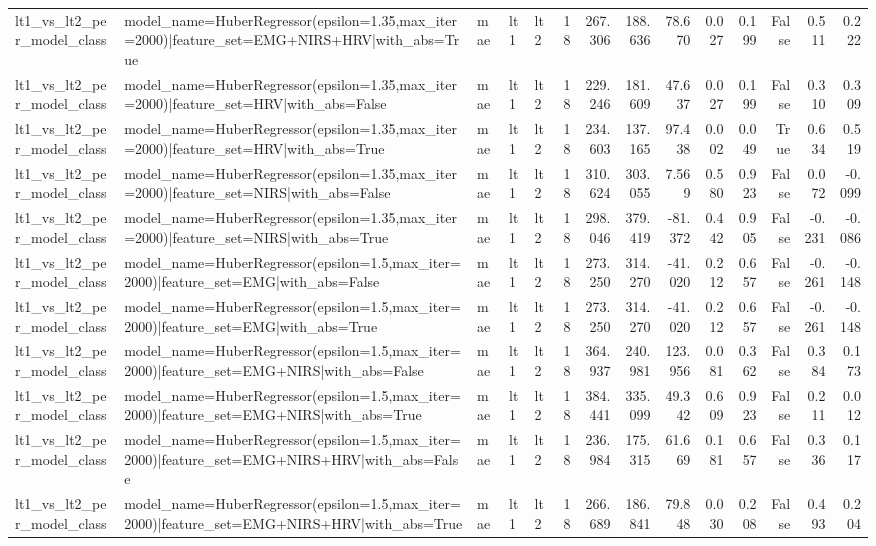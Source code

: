 \begin{table}
\begin{tabular}{lllllrrrrrrrrr}
lt1_vs_lt2_per_model_class & model_name=HuberRegressor(epsilon=1.35,max_iter=2000)|feature_set=EMG+NIRS+HRV|with_abs=True & mae & lt1 & lt2 & 18 & 267.306 & 188.636 & 78.670 & 0.027 & 0.199 & False & 0.511 & 0.222 \\
lt1_vs_lt2_per_model_class & model_name=HuberRegressor(epsilon=1.35,max_iter=2000)|feature_set=HRV|with_abs=False & mae & lt1 & lt2 & 18 & 229.246 & 181.609 & 47.637 & 0.027 & 0.199 & False & 0.310 & 0.309 \\
lt1_vs_lt2_per_model_class & model_name=HuberRegressor(epsilon=1.35,max_iter=2000)|feature_set=HRV|with_abs=True & mae & lt1 & lt2 & 18 & 234.603 & 137.165 & 97.438 & 0.002 & 0.049 & True & 0.634 & 0.519 \\
lt1_vs_lt2_per_model_class & model_name=HuberRegressor(epsilon=1.35,max_iter=2000)|feature_set=NIRS|with_abs=False & mae & lt1 & lt2 & 18 & 310.624 & 303.055 & 7.569 & 0.580 & 0.923 & False & 0.072 & -0.099 \\
lt1_vs_lt2_per_model_class & model_name=HuberRegressor(epsilon=1.35,max_iter=2000)|feature_set=NIRS|with_abs=True & mae & lt1 & lt2 & 18 & 298.046 & 379.419 & -81.372 & 0.442 & 0.905 & False & -0.231 & -0.086 \\
lt1_vs_lt2_per_model_class & model_name=HuberRegressor(epsilon=1.5,max_iter=2000)|feature_set=EMG|with_abs=False & mae & lt1 & lt2 & 18 & 273.250 & 314.270 & -41.020 & 0.212 & 0.657 & False & -0.261 & -0.148 \\
lt1_vs_lt2_per_model_class & model_name=HuberRegressor(epsilon=1.5,max_iter=2000)|feature_set=EMG|with_abs=True & mae & lt1 & lt2 & 18 & 273.250 & 314.270 & -41.020 & 0.212 & 0.657 & False & -0.261 & -0.148 \\
lt1_vs_lt2_per_model_class & model_name=HuberRegressor(epsilon=1.5,max_iter=2000)|feature_set=EMG+NIRS|with_abs=False & mae & lt1 & lt2 & 18 & 364.937 & 240.981 & 123.956 & 0.081 & 0.362 & False & 0.384 & 0.173 \\
lt1_vs_lt2_per_model_class & model_name=HuberRegressor(epsilon=1.5,max_iter=2000)|feature_set=EMG+NIRS|with_abs=True & mae & lt1 & lt2 & 18 & 384.441 & 335.099 & 49.342 & 0.609 & 0.923 & False & 0.211 & 0.012 \\
lt1_vs_lt2_per_model_class & model_name=HuberRegressor(epsilon=1.5,max_iter=2000)|feature_set=EMG+NIRS+HRV|with_abs=False & mae & lt1 & lt2 & 18 & 236.984 & 175.315 & 61.669 & 0.181 & 0.657 & False & 0.336 & 0.117 \\
lt1_vs_lt2_per_model_class & model_name=HuberRegressor(epsilon=1.5,max_iter=2000)|feature_set=EMG+NIRS+HRV|with_abs=True & mae & lt1 & lt2 & 18 & 266.689 & 186.841 & 79.848 & 0.030 & 0.208 & False & 0.493 & 0.204 \\

\end{tabular}
\end{table}
